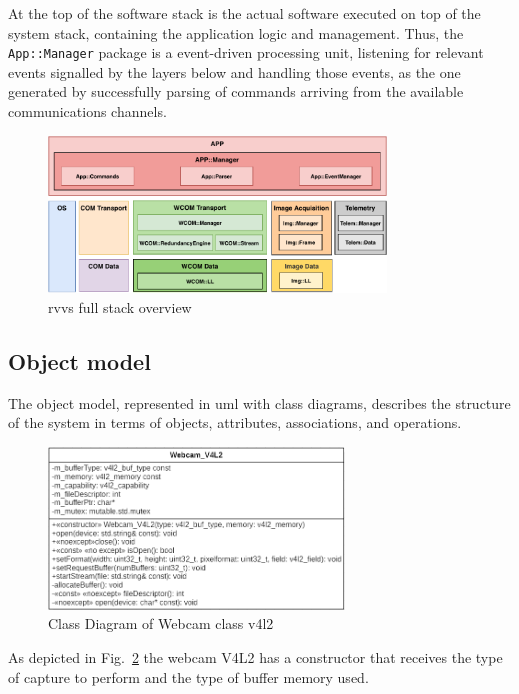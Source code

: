 At the top of the software stack is the actual software executed on top of the
system stack, containing the application logic and management. Thus, the
\texttt{App::Manager} package is a event-driven processing unit, listening for
relevant events signalled by the layers below and handling those events, as the
one generated by successfully parsing of commands arriving from the available
communications channels. 
\begin{figure}[!hbt]
\centering
    \includegraphics[width=0.8\textwidth]{./img/rvvs-full-stack.pdf}
  \caption{\acrshort{rvvs} full stack overview}%
\label{fig:rvvs-full-stack}
\end{figure}
%
\subsection{Object model}%
\label{sec:object-model-rvvs}
The object model, represented in \gls{uml} with class diagrams, describes the
structure of the system in terms of objects, attributes, associations, and
operations. 
%
\begin{figure}[!hbt]
\centering
    \includegraphics[width=0.7\textwidth]{./img/webcam_v4l2_class_diag.png}
  \caption{Class Diagram of Webcam class v4l2}%
\label{fig:webcam-v4l2-class-diag}
\end{figure}
%
As depicted in Fig.~\ref{fig:webcam-v4l2-class-diag} the
webcam V4L2 has a constructor that receives the type of capture to perform and the type of buffer memory used.


